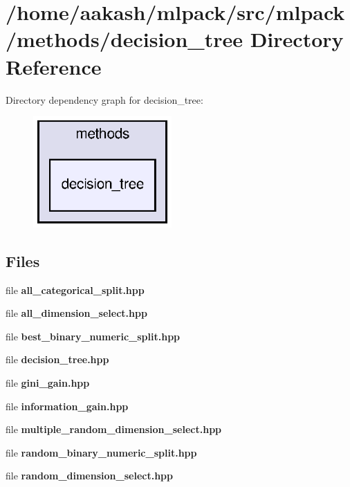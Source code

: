 \section{/home/aakash/mlpack/src/mlpack/methods/decision\+\_\+tree Directory Reference}
\label{dir_f295b20b1dd4e5e0a64437251c55c9ac}
Directory dependency graph for decision\+\_\+tree\+:
\nopagebreak
\begin{figure}[H]
\begin{center}
\leavevmode
\includegraphics[width=150pt]{dir_f295b20b1dd4e5e0a64437251c55c9ac_dep}
\end{center}
\end{figure}
\subsection*{Files}
\begin{DoxyCompactItemize}
\item 
file \textbf{ all\+\_\+categorical\+\_\+split.\+hpp}
\item 
file \textbf{ all\+\_\+dimension\+\_\+select.\+hpp}
\item 
file \textbf{ best\+\_\+binary\+\_\+numeric\+\_\+split.\+hpp}
\item 
file \textbf{ decision\+\_\+tree.\+hpp}
\item 
file \textbf{ gini\+\_\+gain.\+hpp}
\item 
file \textbf{ information\+\_\+gain.\+hpp}
\item 
file \textbf{ multiple\+\_\+random\+\_\+dimension\+\_\+select.\+hpp}
\item 
file \textbf{ random\+\_\+binary\+\_\+numeric\+\_\+split.\+hpp}
\item 
file \textbf{ random\+\_\+dimension\+\_\+select.\+hpp}
\end{DoxyCompactItemize}
